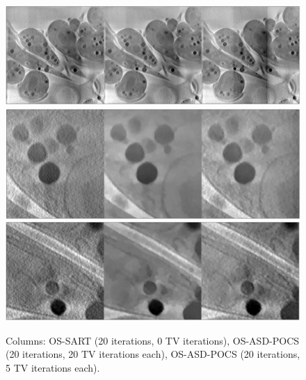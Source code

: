 \begin{figure}
\begin{center}

\includegraphics[width=\textwidth]{Applications/OSSART_0_20_5_TViters.png} 
\includegraphics[width=\textwidth]{Applications/OSSART_0_20_5_TVitersz1.png} 
\includegraphics[width=\textwidth]{Applications/OSSART_0_20_5_TVitersz2.png} 

\end{center}

\caption[Cell image recosntructed with different algorithms 1-3]{\label{fig:OStv}Columns: OS-SART (20 iterations, 0 TV iterations), OS-ASD-POCS (20 iterations, 20 TV iterations each), OS-ASD-POCS (20 iterations, 5 TV iterations each).} 
\end{figure}

\FloatBarrier


